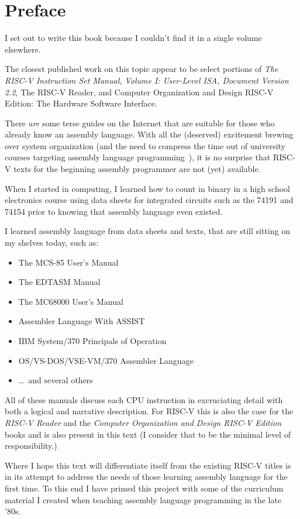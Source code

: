 \chapter{Preface}
\label{chapter:Preface}

I set out to write this book because I couldn't find it in a single volume elsewhere.

The closest published work on this topic appear to be select portions of
{\em The RISC-V Instruction Set Manual, Volume I: User-Level ISA, Document Version 2.2}\cite{rvismv1v22:2017},
{The RISC-V Reader}\cite{riscvreader:2017}, and
{Computer Organization and Design RISC-V Edition: The Hardware Software Interface}\cite{codriscv:2017}.

There {\em are} some terse guides on the Internet that are suitable
for those who already know an assembly language.  With all the (deserved)
excitement brewing over system organization (and the need to compress the
time out of university courses targeting assembly language
programming~\cite{Decker:1985:MAT:989369.989375}),
it is no surprise that RISC-V texts for the beginning assembly programmer
are not (yet) available.

When I started in computing, I learned how to count in binary
in a high school electronics course using data sheets for integrated
circuits such as the 74191\cite{ttl74191:1979} and 74154\cite{ttl74154:1979}
prior to knowing that assembly language even existed.

I learned assembly language from data sheets and texts, that are still sitting on
my shelves today, such as:
\begin{itemize}
\item The MCS-85 User's Manual\cite{mcs85:1978}
\item The EDTASM Manual\cite{edtasm:1978}
\item The MC68000 User's Manual\cite{mc68000:1980}
\item Assembler Language With ASSIST\cite{assist:1983}
\item IBM System/370 Principals of Operation\cite{poo:1980}
\item OS/VS-DOS/VSE-VM/370 Assembler Language\cite{assembler370:1979}
\item \ldots\ and several others
\end{itemize}

All of these manuals discuss each CPU instruction in excruciating detail
with both a logical and narrative description.  For RISC-V this is
also the case for the {\em RISC-V Reader}\cite{riscvreader:2017} and the
{\em Computer Organization and Design RISC-V Edition}\cite{codriscv:2017} books
and is also present in this text (I consider that to be the minimal
level of responsibility.)

Where I hope this text will differentiate itself from the existing RISC-V
titles is in its attempt to address the needs of those learning assembly
language for the first time.  To this end I have primed this project with
some of the curriculum material I created when teaching assembly language
programming in the late '80s.